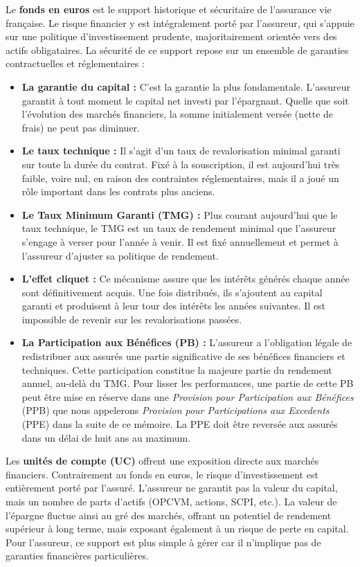Le \textbf{fonds en euros} est le support historique et sécuritaire de l'assurance vie française. Le risque financier y est intégralement porté par l'assureur, qui s'appuie sur une politique d'investissement prudente, majoritairement orientée vers des actifs obligataires. La sécurité de ce support repose sur un ensemble de garanties contractuelles et réglementaires :
\begin{itemize}
    \item \textbf{La garantie du capital :} C'est la garantie la plus fondamentale. L'assureur garantit à tout moment le capital net investi par l'épargnant. Quelle que soit l'évolution des marchés financiers, la somme initialement versée (nette de frais) ne peut pas diminuer.
    \item \textbf{Le taux technique :} Il s'agit d'un taux de revalorisation minimal garanti sur toute la durée du contrat. Fixé à la souscription, il est aujourd'hui très faible, voire nul, en raison des contraintes réglementaires, mais il a joué un rôle important dans les contrats plus anciens.
    \item \textbf{Le Taux Minimum Garanti (TMG) :} Plus courant aujourd'hui que le taux technique, le TMG est un taux de rendement minimal que l'assureur s'engage à verser pour l'année à venir. Il est fixé annuellement et permet à l'assureur d'ajuster sa politique de rendement.
    \item \textbf{L'effet cliquet :} Ce mécanisme assure que les intérêts générés chaque année sont définitivement acquis. Une fois distribués, ils s'ajoutent au capital garanti et produisent à leur tour des intérêts les années suivantes. Il est impossible de revenir sur les revalorisations passées.
    \item \textbf{La Participation aux Bénéfices (PB) :} L'assureur a l'obligation légale de redistribuer aux assurés une partie significative de ses bénéfices financiers et techniques. Cette participation constitue la majeure partie du rendement annuel, au-delà du TMG. Pour lisser les performances, une partie de cette PB peut être mise en réserve dans une \textit{Provision pour Participation aux Bénéfices} (PPB) que nous appelerons \textit{Provision pour Participations aux Excedents} (PPE) dans la suite de ce mémoire. La PPE doit être reversée aux assurés dans un délai de huit ans au maximum.
\end{itemize}


\bigskip

Les \textbf{unités de compte (UC)} offrent une exposition directe aux marchés financiers. Contrairement au fonds en euros, le risque d'investissement est entièrement porté par l'assuré. L'assureur ne garantit pas la valeur du capital, mais un nombre de parts d'actifs (OPCVM, actions, SCPI, etc.). La valeur de l'épargne fluctue ainsi au gré des marchés, offrant un potentiel de rendement supérieur à long terme, mais exposant également à un risque de perte en capital. Pour l'assureur, ce support est plus simple à gérer car il n'implique pas de garanties financières particulières.

